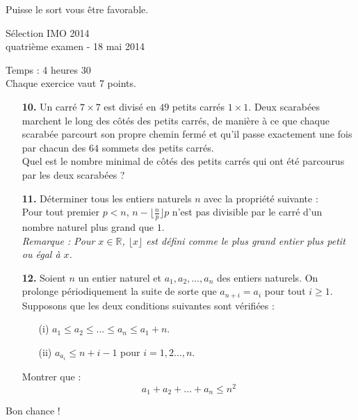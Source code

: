 \documentclass[12pt,a4paper]{article}
\theoremstyle{plain}
\theoremstyle{definition}
\begin{document}
\bigskip
\bigskip
\begin{center}
Puisse le sort vous être favorable.
\end{center}

\pagebreak


\begin{center}
{\huge Sélection IMO 2014} \\
\medskip quatrième examen - 18 mai 2014
\end{center}
\vspace{8mm}
Temps : 4 heures 30\\
Chaque exercice vaut 7 points.

\vspace{15mm}

\begin{enumerate}
\item[\textbf{10.}] Un carré $7\times 7$ est divisé en $49$ petits carrés $1\times 1$. Deux scarabées marchent le long des côtés des petits carrés, de manière à ce que chaque scarabée parcourt son propre chemin fermé et qu'il passe exactement une fois par chacun des $64$ sommets des petits carrés. \\
Quel est le nombre minimal de côtés des petits carrés qui ont été parcourus par les deux scarabées ?


\bigskip
\bigskip


\item[\textbf{11.}] Déterminer tous les entiers naturels $n$ avec la propriété suivante : \\
Pour tout premier $p<n$, $n-\lfloor \frac{n}{p}\rfloor p$ n'est pas divisible par le carré d'un nombre naturel plus grand que $1$.\\
\textit{Remarque : Pour $x \in \mathbb{R}$, $\lfloor x\rfloor$ est défini comme le plus grand entier plus petit ou égal à $x$.}
\bigskip
\bigskip

\item[\textbf{12.}] Soient $n$ un entier naturel et $a_1,a_2, \dots,a_n$ des entiers naturels. On prolonge périodiquement la suite de sorte que $a_{n+i} = a_i$ pour tout $i\geq 1$. Supposons que les deux conditions suivantes sont vérifiées :
\begin{enumerate}
\item[(i)] 	$a_1\leq a_2\leq\dots \leq a_n\leq a_1 +n$.
\item[(ii)] $a_{a_i} \leq n+i-1$ pour $i=1,2\dots,n$.
\end{enumerate}
Montrer que :
\[a_1+a_2+\dots +a_n \leq n^2\]

\end{enumerate}
\bigskip
\begin{center}
Bon chance !
\end{center}
\end{document}
